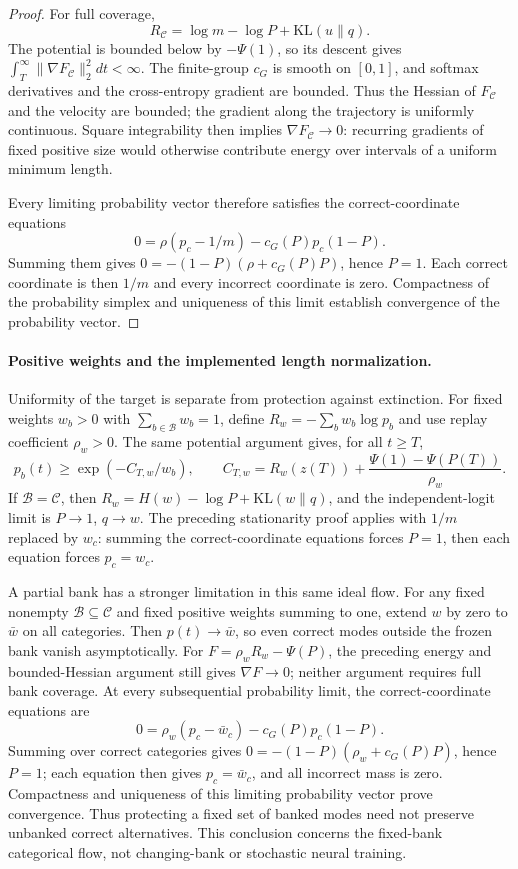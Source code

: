 \documentclass{article}
\newcommand{\1}{\mathbf 1}
\theoremstyle{remark}
\theoremstyle{definition}
\theoremstyle{plain}
\begin{document}
\begin{proof}
For full coverage,
\begin{equation}
 R_{\mathcal C}=\log m-\log P+\mathrm{KL}(u\|q).
 \label{eq:replay-mass-uniformity-decomposition}
\end{equation}
The potential is bounded below by $-\Psi(1)$, so its descent gives
$\int_T^\infty\|\nabla F_{\mathcal C}\|_2^2dt<\infty$. The finite-group
$c_G$ is smooth on $[0,1]$, and softmax derivatives and the cross-entropy
gradient are bounded. Thus the Hessian of $F_{\mathcal C}$ and the velocity
are bounded; the gradient along the trajectory is uniformly continuous.
Square integrability then implies $\nabla F_{\mathcal C}\to0$: recurring
gradients of fixed positive size would otherwise contribute energy over
intervals of a uniform minimum length.

Every limiting probability vector therefore satisfies the correct-coordinate
equations
\[
 0=\rho(p_c-1/m)-c_G(P)p_c(1-P).
\]
Summing them gives $0=-(1-P)(\rho+c_G(P)P)$, hence $P=1$. Each correct
coordinate is then $1/m$ and every incorrect coordinate is zero. Compactness
of the probability simplex and uniqueness of this limit establish convergence
of the probability vector.
\end{proof}

\paragraph{Positive weights and the implemented length normalization.}
Uniformity of the target is separate from protection against extinction.
For fixed weights $w_b>0$ with $\sum_{b\in\mathcal B}w_b=1$, define
$R_w=-\sum_b w_b\log p_b$ and use replay coefficient $\rho_w>0$.
The same potential argument gives, for all $t\ge T$,
\[
 p_b(t)\ge\exp(-C_{T,w}/w_b),\qquad
 C_{T,w}=R_w(z(T))+\frac{\Psi(1)-\Psi(P(T))}{\rho_w}.
\]
If $\mathcal B=\mathcal C$, then
$R_w=H(w)-\log P+\mathrm{KL}(w\|q)$, and the independent-logit limit is
$P\to1$, $q\to w$. The preceding stationarity proof applies with $1/m$
replaced by $w_c$: summing the correct-coordinate equations forces $P=1$,
then each equation forces $p_c=w_c$.

A partial bank has a stronger limitation in this same ideal flow. For any
fixed nonempty $\mathcal B\subseteq\mathcal C$ and fixed positive weights
summing to one, extend $w$ by zero to $\bar w$ on all categories. Then
$p(t)\to\bar w$, so even correct modes outside the frozen bank vanish
asymptotically. For $F=\rho_wR_w-\Psi(P)$, the preceding energy and
bounded-Hessian argument still gives $\nabla F\to0$; neither argument
requires full bank coverage.
At every subsequential probability limit, the correct-coordinate equations are
\[
 0=\rho_w(p_c-\bar w_c)-c_G(P)p_c(1-P).
\]
Summing over correct categories gives
$0=-(1-P)(\rho_w+c_G(P)P)$, hence $P=1$; each equation then gives
$p_c=\bar w_c$, and all incorrect mass is zero. Compactness and uniqueness
of this limiting probability vector prove convergence. Thus protecting a
fixed set of banked modes need not preserve unbanked correct alternatives.
This conclusion concerns the fixed-bank categorical flow, not changing-bank
or stochastic neural training.
\end{document}

